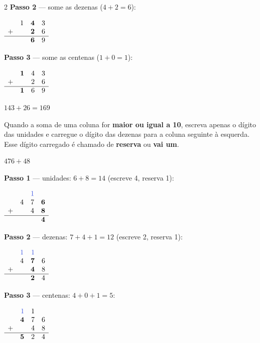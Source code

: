 \documentclass[12pt]{article}
\begin{document}
\begin{multicols}{2}
\textbf{Passo 2} — some as dezenas ($4 + 2 = 6$):

$\begin{array}{rrrr}
&1&\textbf{4}&3\\
+&&\textbf{2}&6\\
\hline
&&\textbf{6}&9\\
\end{array}$

\textbf{Passo 3} — some as centenas ($1 + 0 = 1$):

$\begin{array}{rrrr}
&\textbf{1}&4&3\\
+&&2&6\\
\hline
&\textbf{1}&6&9\\
\end{array}$

$143 + 26 = 169$


Quando a soma de uma coluna for \textbf{maior ou igual a 10}, escreva apenas o dígito das unidades e carregue o dígito das dezenas para a coluna seguinte à esquerda. Esse dígito carregado é chamado de \textbf{reserva} ou \textbf{vai um}.

 $476 + 48$

\vspace{4pt}

\textbf{Passo 1} — unidades: $6 + 8 = 14$ (escreve 4, reserva 1):

$\begin{array}{rrrr}
& & \textcolor{iris}{1} & \\
&4&7&\textbf{6}\\
+&&4&\textbf{8}\\
\hline
&&&\textbf{4}\\
\end{array}$

\textbf{Passo 2} — dezenas: $7 + 4 + 1 = 12$ (escreve 2, reserva 1):

$\begin{array}{rrrr}
& \textcolor{iris}{1} & \textcolor{iris}{1} & \\
&4&\textbf{7}&6\\
+&&\textbf{4}&8\\
\hline
&&\textbf{2}&4\\
\end{array}$

\textbf{Passo 3} — centenas: $4 + 0 + 1 = 5$:

$\begin{array}{rrrr}
& \textcolor{iris}{1} & 1 & \\
&\textbf{4}&7&6\\
+&&4&8\\
\hline
&\textbf{5}&2&4\\
\end{array}$


\end{multicols}
\end{document}
